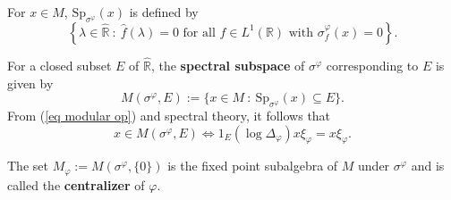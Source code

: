 \documentclass[12pt]{amsart}
\newtheorem{lem}[thm]{Lemma}
\theoremstyle{definition}
\begin{document}
For $x\in M$, $\text{Sp}_{\sigma^{\varphi}}(x)$ is defined by
\[\left \{\lambda \in \widehat{\mathbb{R}} \ : \ \hat{f}(\lambda)=0 \text{  for all } f\in L^1(\mathbb{R}) \text{  with  }\sigma^{\varphi}_f(x)=0\right \}.\] 

For a closed subset $E$ of $\widehat{\mathbb{R}}$, the \textbf{spectral subspace} of $\sigma^{\varphi}$ corresponding to $E$ is given by 
\[M(\sigma^{\varphi},E):=\{x\in M\ : \ \text{Sp}_{\sigma^{\varphi}}(x)\subseteq E\}.\]
From (\ref{eq modular op}) and spectral theory, it follows that  
\[x\in M(\sigma^{\varphi},E)\iff 1_E(\log \Delta_{\varphi})x\xi_{\varphi}=x\xi_{\varphi}.\]

The set $M_{\varphi}:=M(\sigma^{\varphi},\{0\})$ is the fixed point subalgebra of $M$ under $\sigma^{\varphi}$ and is called the \textbf{centralizer} of $\varphi$.

\end{document}
